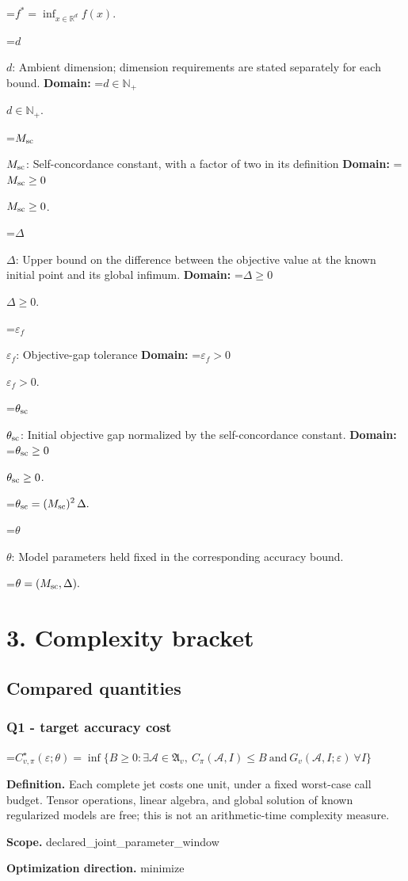 \documentclass[10pt,a4paper]{article}
\newcommand{\AtlasMath}[1]{\par\begingroup\centering\setbox0=\hbox{$\displaystyle #1$}\ifdim\wd0>1.4\linewidth\typeout{ATLAS WIDE FORMULA: \the\wd0}\fi\ifdim\wd0>\linewidth\resizebox{\linewidth}{!}{\box0}\else\box0\fi\par\endgroup}
\newcommand{\AtlasInlineMath}[1]{\begingroup\setbox0=\hbox{$#1$}\ifdim\wd0>.4\linewidth\endgroup\AtlasMath{#1}\else\endgroup$#1$\fi}
\begin{document}
\AtlasMath{f^*=\inf_{x\in \mathbb{R}^d}f(x).}


\AtlasInlineMath{d}: Ambient dimension; dimension requirements are stated separately for each bound. \textbf{Domain:} \AtlasInlineMath{d\in\mathbb{N}_{+}}.

\AtlasInlineMath{M_{\rm sc}}: Self-concordance constant, with a factor of two in its definition \textbf{Domain:} \AtlasInlineMath{M_{\rm sc}\ge0}.

\AtlasInlineMath{\Delta}: Upper bound on the difference between the objective value at the known initial point and its global infimum. \textbf{Domain:} \AtlasInlineMath{\Delta\ge0}.

\AtlasInlineMath{\varepsilon_f}: Objective-gap tolerance \textbf{Domain:} \AtlasInlineMath{\varepsilon_f>0}.

\AtlasInlineMath{\theta_{\rm sc}}: Initial objective gap normalized by the self-concordance constant. \textbf{Domain:} \AtlasInlineMath{\theta_{\rm sc}\ge0}.


\AtlasMath{\theta_{\rm sc}=(M_{\rm sc})^{2}\,\Delta.}


\AtlasInlineMath{\theta}: Model parameters held fixed in the corresponding accuracy bound.


\AtlasMath{\theta=(M_{\rm sc},\Delta).}


\section{3. Complexity bracket}
\subsection{Compared quantities}
\subsubsection{Q1 - target accuracy cost}
\AtlasMath{C^\star_{v,\pi}(\varepsilon;\theta)=\inf\{B\ge0:\exists\mathcal A\in\mathfrak A_v,\ C_\pi(\mathcal A,I)\le B\ \text{and}\ G_v(\mathcal A,I;\varepsilon)\ \forall I\}}
\textbf{Definition.} Each complete jet costs one unit, under a fixed worst-case call budget. Tensor operations, linear algebra, and global solution of known regularized models are free; this is not an arithmetic-time complexity measure.

\textbf{Scope.} declared\_joint\_parameter\_window

\textbf{Optimization direction.} minimize
\end{document}
